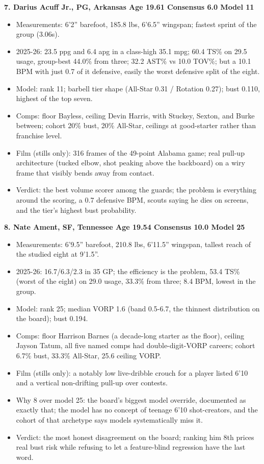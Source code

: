 \documentclass[
  10pt,
]{article}
\providecommand{\tightlist}{%
  \setlength{\itemsep}{0pt}\setlength{\parskip}{0pt}}
\begin{document}
\textbf{7. Darius Acuff Jr., PG, Arkansas \textbar{} Age 19.61 \textbar{}
Consensus 6.0 \textbar{} Model 11}

\begin{itemize}
\tightlist
\item
  Measurements: 6'2'' barefoot, 185.8 lbs, 6'6.5'' wingspan; fastest sprint of
  the group (3.06s).
\item
  2025-26: 23.5 ppg and 6.4 apg in a class-high 35.1 mpg; 60.4 TS\% on 29.5
  usage, group-best 44.0\% from three; 32.2 AST\% vs 10.0 TOV\%; but a 10.1 BPM
  with just 0.7 of it defensive, easily the worst defensive split of the eight.
\item
  Model: rank 11; barbell tier shape (All-Star 0.31 / Rotation 0.27); bust
  0.110, highest of the top seven.
\item
  Comps: floor Bayless, ceiling Devin Harris, with Stuckey, Sexton, and Burke
  between; cohort 20\% bust, 20\% All-Star, ceilings at good-starter rather than
  franchise level.
\item
  Film (stills only): 316 frames of the 49-point Alabama game; real pull-up
  architecture (tucked elbow, shot peaking above the backboard) on a wiry frame
  that visibly bends away from contact.
\item
  Verdict: the best volume scorer among the guards; the problem is everything
  around the scoring, a 0.7 defensive BPM, scouts saying he dies on screens, and
  the tier's highest bust probability.
\end{itemize}

\textbf{8. Nate Ament, SF, Tennessee \textbar{} Age 19.54 \textbar{} Consensus
10.0 \textbar{} Model 25}

\begin{itemize}
\tightlist
\item
  Measurements: 6'9.5'' barefoot, 210.8 lbs, 6'11.5'' wingspan, tallest reach of
  the studied eight at 9'1.5''.
\item
  2025-26: 16.7/6.3/2.3 in 35 GP; the efficiency is the problem, 53.4 TS\%
  (worst of the eight) on 29.0 usage, 33.3\% from three; 8.4 BPM, lowest in the
  group.
\item
  Model: rank 25; median VORP 1.6 (band 0.5-6.7, the thinnest distribution on
  the board); bust 0.194.
\item
  Comps: floor Harrison Barnes (a decade-long starter as the floor), ceiling
  Jayson Tatum, all five named comps had double-digit-VORP careers; cohort 6.7\%
  bust, 33.3\% All-Star, 25.6 ceiling VORP.
\item
  Film (stills only): a notably low live-dribble crouch for a player listed 6'10
  and a vertical non-drifting pull-up over contests.
\item
  Why 8 over model 25: the board's biggest model override, documented as exactly
  that; the model has no concept of teenage 6'10 shot-creators, and the cohort
  of that archetype says models systematically miss it.
\item
  Verdict: the most honest disagreement on the board; ranking him 8th prices
  real bust risk while refusing to let a feature-blind regression have the last
  word.
\end{itemize}
\end{document}
